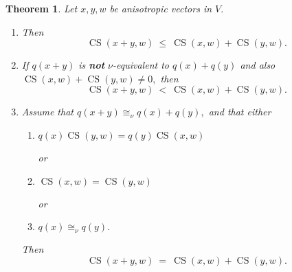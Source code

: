 \documentclass [12pt,a4paper,reqno]{amsart}
\newtheorem{thm}{Theorem} [section]
\begin{document}
\begin{thm}\label{thm:II.6.10}
Let $x,y,w$  be anisotropic vectors in $V.$

\begin{enumerate}
\item[a)] Then
\begin{equation}\label{eq:II.6.10}
{\operatorname{CS}}(x+y,w){\ {\le} \ }{\operatorname{CS}}(x,w)+{\operatorname{CS}}(y,w).\end{equation}

\item[b)] If $q(x+y)$ is {\textbf{{not}}} $\nu$-equivalent to
$q(x)+q(y)$ and also ${\operatorname{CS}}(x,w)+{\operatorname{CS}}(y,w)\ne0,$ then
\begin{equation}\label{eq:II.6.11}
{\operatorname{CS}}(x+y,w){\ {<} \ }{\operatorname{CS}}(x,w)+{\operatorname{CS}}(y,w).\end{equation}

\item[c)] Assume that $q(x+y)\cong_\nu q(x)+q(y),$ and that either {\vskip 1.5mm \noindent}

\begin{enumerate}
\item[c1)] $q(x){\operatorname{CS}}(y,w)=q(y){\operatorname{CS}}(x,w)$

or

\item[c2)] ${\operatorname{CS}}(x,w)={\operatorname{CS}}(y,w)$

or

\item[c3)] $q(x)\cong_\nu q(y).$

 \end{enumerate} {\vskip 1.5mm \noindent}
Then
\begin{equation}\label{eq:II.6.12}
{\operatorname{CS}}(x+y,w){\ {=} \ }{\operatorname{CS}}(x,w)+{\operatorname{CS}}(y,w).\end{equation}
\end{enumerate}
\end{thm}
\end{document}
